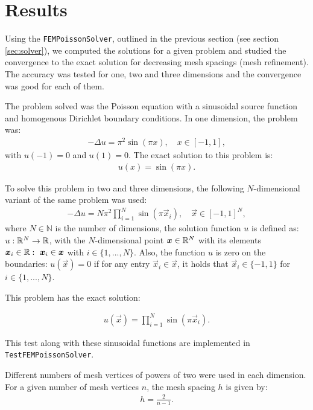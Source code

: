 \section{Results}

Using the \texttt{FEMPoissonSolver}, outlined in the previous section (see section \ref{sec:solver}),
we computed the solutions for a given problem and studied the convergence to the
exact solution for decreasing mesh spacings (mesh refinement).
The accuracy was tested for one, two and three dimensions and the convergence was good for each of them.

The problem solved was the Poisson equation with a sinusoidal source function
and homogenous Dirichlet boundary conditions.
In one dimension, the problem was:
\begin{align}
    -\Delta u = \pi^2 \sin(\pi x), \quad x \in [-1, 1],
\end{align}
with $u(-1) = 0$ and $u(1) = 0$.
The exact solution to this problem is:
\begin{align}
    u(x) = \sin(\pi x).
\end{align}

To solve this problem in two and three dimensions, the following $N$-dimensional variant of the same problem was used:
\begin{align}
    -\Delta u = N \pi^2 \prod_{i=1}^N \sin(\pi \vec{x}_i), \quad \vec{x} \in [-1, 1]^N,
\end{align}
where $N \in \mathbb{N}$ is the number of dimensions, the solution function $u$ is defined as:
$u: \mathbb{R}^N \to \mathbb{R}$, with the $N$-dimensional point $\boldsymbol{x} \in \mathbb{R}^N$ with its elements $\boldsymbol{x}_i \in \mathbb{R} : \ \boldsymbol{x}_i \in \boldsymbol{x}$ with $i \in \{1, ..., N\}$.
Also, the function $u$ is zero on the boundaries: $u(\vec{x}) = 0$ if for any entry $\vec{x}_i \in \vec{x}$,
it holds that $\vec{x}_i \in \{-1, 1\}$ for $i \in \{1, ..., N\}$.

This problem has the exact solution:

\begin{align}
    u(\vec{x}) = \prod_{i=1}^N \sin(\pi \vec{x}_i).
\end{align}

This test along with these sinusoidal functions are implemented in \texttt{TestFEMPoissonSolver}.

Different numbers of mesh vertices of powers of two were used in each dimension.
For a given number of mesh vertices $n$, the mesh spacing $h$ is given by:
\begin{align}
    h = \frac{2}{n - 1}.
    \label{eq:spacing}
\end{align}

